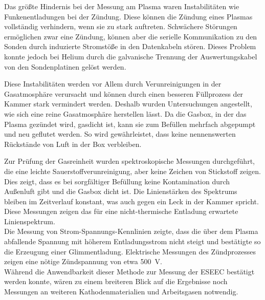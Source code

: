 Das größte Hindernis bei der Messung am Plasma waren Instabilitäten wie Funkenentladungen bei der Zündung. Diese können die Zündung eines Plasmas vollständig verhindern, wenn sie zu stark auftreten. Schwächere Störungen ermöglichen zwar eine Zündung, können aber die serielle Kommunikation zu den Sonden durch induzierte Stromstöße in den Datenkabeln stören. Dieses Problem konnte jedoch bei Helium durch die galvanische Trennung der Auswertungskabel von den Sondenplatinen gelöst werden.

Diese Instabilitäten werden vor Allem durch Verunreinigungen in der Gasatmosphäre verursacht und können durch einen besseren Füllprozess der Kammer stark vermindert werden. Deshalb wurden Untersuchungen angestellt, wie sich eine reine Gasatmosphäre herstellen lässt. Da die Gasbox, in der das Plasma gezündet wird, gasdicht ist, kann sie zum Befüllen mehrfach abgepumpt und neu geflutet werden. So wird gewährleistet, dass keine nennenswerten Rückstände von Luft in der Box verbleiben.

Zur Prüfung der Gasreinheit wurden spektroskopische Messungen durchgeführt, die eine leichte Sauerstoffverunreinigung, aber keine Zeichen von Stickstoff zeigen. Dies zeigt, dass es bei sorgfältiger Befüllung keine Kontamination durch Außenluft gibt und die Gasbox dicht ist. Die Linienstärken des Spektrums bleiben im Zeitverlauf konstant, was auch gegen ein Leck in der Kammer spricht. Diese Messungen zeigen das für eine nicht-thermische Entladung erwartete Linienspektrum.\\

Die Messung von Strom-Spannungs-Kennlinien zeigte, dass die über dem Plasma abfallende Spannung mit höherem Entladungsstrom nicht steigt und bestätigte so die Erzeugung einer Glimmentladung. Elektrische Messungen des Zündprozesses zeigen eine nötige Zündspannung von etwa \qty{500}{V}.\\

Während die Anwendbarkeit dieser Methode zur Messung der ESEEC bestätigt werden konnte, wären zu einem breiteren Blick auf die Ergebnisse noch Messungen an weiteren Kathodenmaterialien und Arbeitsgasen notwendig.